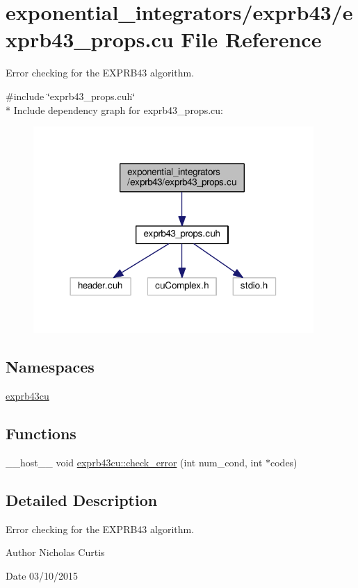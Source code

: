\hypertarget{exprb43__props_8cu}{}\section{exponential\+\_\+integrators/exprb43/exprb43\+\_\+props.cu File Reference}
\label{exprb43__props_8cu}


Error checking for the E\+X\+P\+R\+B43 algorithm.  


{\ttfamily \#include \char`\"{}exprb43\+\_\+props.\+cuh\char`\"{}}\\*
Include dependency graph for exprb43\+\_\+props.\+cu\+:\nopagebreak
\begin{figure}[H]
\begin{center}
\leavevmode
\includegraphics[width=302pt]{exprb43__props_8cu__incl}
\end{center}
\end{figure}
\subsection*{Namespaces}
\begin{DoxyCompactItemize}
\item 
 \hyperlink{namespaceexprb43cu}{exprb43cu}
\end{DoxyCompactItemize}
\subsection*{Functions}
\begin{DoxyCompactItemize}
\item 
\+\_\+\+\_\+host\+\_\+\+\_\+ void \hyperlink{namespaceexprb43cu_aea2a90f02f654f5e485a7bea9c34985f}{exprb43cu\+::check\+\_\+error} (int num\+\_\+cond, int $\ast$codes)
\end{DoxyCompactItemize}


\subsection{Detailed Description}
Error checking for the E\+X\+P\+R\+B43 algorithm. 

\begin{DoxyAuthor}{Author}
Nicholas Curtis 
\end{DoxyAuthor}
\begin{DoxyDate}{Date}
03/10/2015 
\end{DoxyDate}
